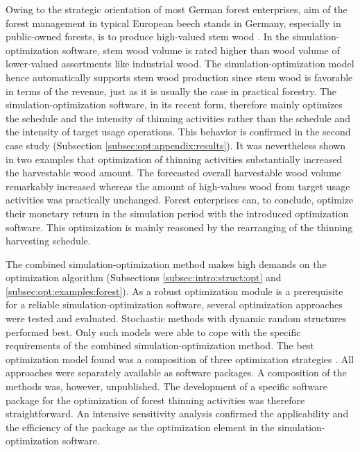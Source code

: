 Owing to the strategic orientation of most German forest enterprises, aim of the forest management in typical European beech stands in Germany, especially in public-owned forests, is to produce high-valued stem wood \citep{nagel_2008}. In the simulation-optimization software, stem wood volume is rated higher than wood volume of lower-valued assortments like industrial wood. The simulation-optimization model hence automatically supports stem wood production since stem wood is favorable in terms of the revenue, just as it is usually the case in practical forestry. The simulation-optimization software, in its recent form, therefore mainly optimizes the schedule and the intensity of thinning activities rather than the schedule and the intensity of target usage operations. This behavior is confirmed in the second case study (Subsection \ref{subsec:opt:appendix:results}). It was nevertheless shown in two examples that optimization of thinning activities substantially increased the harvestable wood amount. The forecasted overall harvestable wood volume remarkably increased whereas the amount of high-values wood from target usage activities was practically unchanged. Forest enterprises can, to conclude, optimize their monetary return in the simulation period with the introduced optimization software. This optimization is mainly reasoned by the rearranging of the thinning harvesting schedule.

The combined si\-mu\-la\-tion-op\-ti\-mi\-za\-tion method makes high demands on the optimization algorithm (Subsections \ref{subsec:intro:struct:opt} and \ref{subsec:opt:examples:forest}). As a robust optimization module is a prerequisite for a reliable si\-mu\-la\-tion-op\-ti\-mi\-za\-tion software, several optimization approaches were tested and evaluated. Stochastic methods with dynamic random structures performed best. Only such models were able to cope with the specific requirements of the combined si\-mu\-la\-tion-op\-ti\-mi\-za\-tion method. The best optimization model found was a composition of three optimization strategies \citep{corana_1987, kirkpatrick_1983, pronzato_1984}. All approaches were separately available as software packages. A composition of the methods was, however, unpublished. The development of a specific software package for the optimization of forest thinning activities was therefore straightforward. An intensive sensitivity analysis confirmed the applicability and the efficiency of the package as the optimization element in the si\-mu\-la\-tion-op\-ti\-mi\-za\-tion software.

